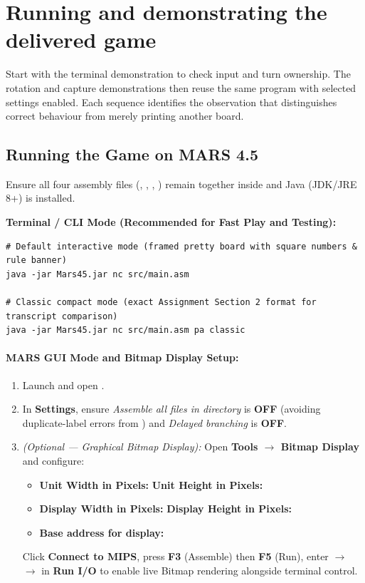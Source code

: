 \section{Running and demonstrating the delivered game}
\label{sec:guide}

Start with the terminal demonstration to check input and turn ownership. The rotation and capture demonstrations then reuse the same program with selected settings enabled. Each sequence identifies the observation that distinguishes correct behaviour from merely printing another board.

\subsection{Running the Game on MARS 4.5}
\label{sec:run_mars}
Ensure all four assembly files (, , , ) remain together inside  and Java (JDK/JRE 8+) is installed.

\textbf{Terminal / CLI Mode (Recommended for Fast Play and Testing):}\par\nopagebreak
\begin{lstlisting}[style=termstyle]
# Default interactive mode (framed pretty board with square numbers & rule banner)
java -jar Mars45.jar nc src/main.asm

# Classic compact mode (exact Assignment Section 2 format for transcript comparison)
java -jar Mars45.jar nc src/main.asm pa classic
\end{lstlisting}

\paragraph{MARS GUI Mode and Bitmap Display Setup:}
\begin{enumerate}
    \item Launch  and open .
    \item In \textbf{Settings}, ensure \emph{Assemble all files in directory} is \textbf{OFF} (avoiding duplicate-label errors from ) and \emph{Delayed branching} is \textbf{OFF}.
    \item \emph{(Optional — Graphical Bitmap Display):} Open \textbf{Tools $\rightarrow$ Bitmap Display} and configure:
    \begin{itemize}
        \item \textbf{Unit Width in Pixels:}  \qquad \textbf{Unit Height in Pixels:} 
        \item \textbf{Display Width in Pixels:}  \qquad \textbf{Display Height in Pixels:} 
        \item \textbf{Base address for display:} 
    \end{itemize}
    Click \textbf{Connect to MIPS}, press \textbf{F3} (Assemble) then \textbf{F5} (Run), enter  $\to$  $\to$  in \textbf{Run I/O} to enable live Bitmap rendering alongside terminal control.
\end{enumerate}


